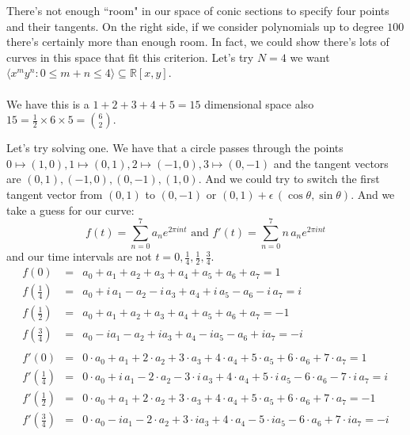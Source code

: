 \documentclass[12pt]{article}
\begin{document}
\begin{tikzpicture}
\end{tikzpicture}
There's not enough ``room" in our space of conic sections to specify four points and their tangents.  On the right side, if we consider polynomials up to degree $100$ there's certainly more than enough room.  In fact, we could show there's lots of curves in this space that fit this criterion.  Let's try $N = 4$ we want $\langle x^m y^n : 0 \leq m + n \leq 4 \rangle \subseteq \mathbb{R}[x,y] $. \\ \\
We have this is a $1 + 2 + 3 + 4 + 5 = 15$ dimensional space also  $15 = \frac{1}{2} \times 6 \times 5  =  \binom{6}{2}  $.

\newpage

\noindent Let's try solving one.  We have that a circle passes through the points $0 \mapsto (1,0), 1 \mapsto (0,1),2 \mapsto (-1,0), 3 \mapsto (0,-1)$ and the tangent vectors are $(0,1), (-1,0), (0,-1), (1,0)$.  And we could try to switch the first tangent vector from $(0,1)$ to $(0,-1)$ or $(0,1) + \epsilon \, ( \cos \theta, \sin \theta )$.  And we take a guess for our curve:
$$ f(t) = \sum_{n = 0}^7 a_n e^{2\pi i n t} \text{ and } f'(t) = \sum_{n = 0}^7 n \, a_n e^{2\pi i n t}$$
and our time intervals are not $t = 0, \frac{1}{4}, \frac{1}{2}, \frac{3}{4}$.  
\begin{eqnarray*}
f(0) &=& a_0 + a_1 + a_2 + a_3 + a_4 + a_5 + a_6 + a_7 = 1 \\
f(\tfrac{1}{4}) &=& a_0 + i \, a_1 - a_2 - i \, a_3 + a_4 + i\, a_5 - a_6 - i \,a_7 = i \\
f(\tfrac{1}{2}) &=& a_0 + a_1 + a_2 + a_3 + a_4 + a_5 + a_6 + a_7 = - 1 \\
f(\tfrac{3}{4}) &=& a_0 - i a_1 - a_2 + i a_3 + a_4 - i a_5 - a_6 + i a_7 = - i \\ \\
f'(0) &=& 0\cdot a_0 + a_1 + 2 \cdot a_2 + 3 \cdot a_3 + 4 \cdot a_4 + 5 \cdot a_5 + 6 \cdot a_6 + 7 \cdot  a_7 = 1 \\
f'(\tfrac{1}{4}) &=& 0\cdot a_0 + i \, a_1 - 2 \cdot a_2 - 3 \cdot i \, a_3 + 4 \cdot a_4 + 5 \cdot i\, a_5 - 6 \cdot a_6 - 7 \cdot i \,a_7 = i \\
f'(\tfrac{1}{2}) &=& 0\cdot a_0 + a_1 + 2 \cdot a_2 + 3 \cdot a_3 + 4 \cdot a_4 + 5 \cdot a_5 + 6 \cdot a_6 + 7 \cdot  a_7 = - 1 \\
f'(\tfrac{3}{4}) &=& 0\cdot a_0 - i a_1 - 2 \cdot a_2 + 3 \cdot i a_3 + 4 \cdot a_4 - 5 \cdot i a_5 - 6 \cdot a_6 + 7 \cdot  i a_7 = - i 
\end{eqnarray*} 
\end{document}

